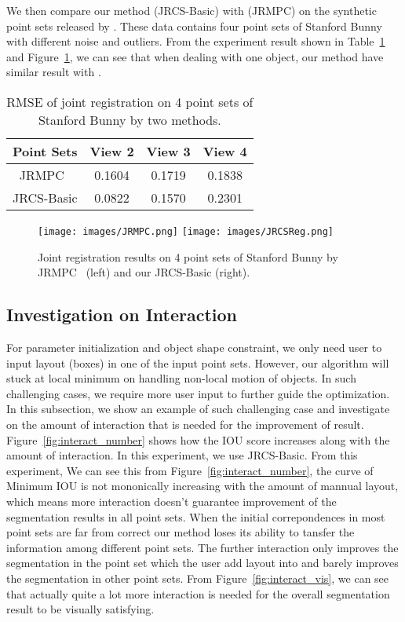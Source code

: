 We then compare our method (JRCS-Basic) with \cite{Evangelidis2014}(JRMPC) on the synthetic point sets released by \cite{Evangelidis2014}. These data contains four point sets of Stanford Bunny with different noise and outliers. From the experiment result shown in Table~\ref{tab:reg} and Figure~\ref{fig:reg}, we can see that when dealing with one object, our method have similar result with \cite{Evangelidis2014}.

\begin{table}
	\centering
	\caption{RMSE of joint registration on 4 point sets of Stanford Bunny by two methods.}
	\begin{tabular}{c c c c}
		Point Sets& View 2 & View 3 & View 4 \\
		\hline
		JRMPC~\cite{Evangelidis2014} & 0.1604 & 0.1719 & 0.1838\\   
		JRCS-Basic & 0.0822 &  0.1570  & 0.2301\\
	\end{tabular}
	\label{tab:reg}
\end{table}
\begin{figure}[htb]
	\centering
	\texttt{[image: images/JRMPC.png]}
	\texttt{[image: images/JRCSReg.png]}
	\caption{Joint registration results on 4 point sets of Stanford Bunny by JRMPC~\cite{Evangelidis2014} (left) and our JRCS-Basic (right).}
	\label{fig:reg}
\end{figure}

\subsection{Investigation on Interaction}
\label{subsec:interact}

For parameter initialization and object shape constraint, we only need user to input layout (boxes) in one of the input point sets. However, our algorithm will stuck at local minimum on handling non-local motion of objects. In such challenging cases, we require more user input to further guide the optimization. In this subsection, we show an example of such challenging case and investigate on the amount of interaction that is needed for the improvement of result. Figure~\ref{fig:interact_number} shows how the IOU score increases along with the amount of interaction. In this experiment, we use JRCS-Basic. From this experiment,  We can see this from Figure~\ref{fig:interact_number}, the curve of Minimum IOU is not mononically increasing with the amount of mannual layout, which means more interaction doesn't guarantee improvement of the segmentation results in all point sets.  When the initial correpondences in most point sets are far from correct our method loses its ability to tansfer the information among different point sets. The further interaction only improves the segmentation in the point set which the user add layout into and barely improves the segmentation in other point sets.
From Figure~\ref{fig:interact_vis}, we can see that actually quite a lot more interaction is needed for the overall segmentation result to be visually satisfying.
 
